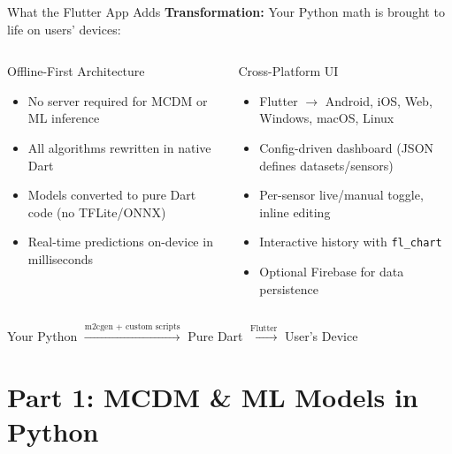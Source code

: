 \documentclass[aspectratio=169]{beamer}
\begin{document}
\begin{frame}{What the Flutter App Adds}
  \textbf{Transformation:} Your Python math is brought to life on users' devices:

  \vspace{0.3cm}
  \begin{columns}
    \begin{block}{Offline-First Architecture}
      \begin{itemize}
        \item No server required for MCDM or ML inference
        \item All algorithms rewritten in \alert{native Dart}
        \item Models converted to \alert{pure Dart code} (no TFLite/ONNX)
        \item Real-time predictions on-device in milliseconds
      \end{itemize}
    \end{block}
    \begin{block}{Cross-Platform UI}
      \begin{itemize}
        \item Flutter $\rightarrow$ Android, iOS, Web, Windows, macOS, Linux
        \item Config-driven dashboard (JSON defines datasets/sensors)
        \item Per-sensor live/manual toggle, inline editing
        \item Interactive history with \texttt{fl\_chart}
        \item Optional Firebase for data persistence
      \end{itemize}
    \end{block}
  \end{columns}

  \vspace{0.3cm}
  \centering
  \small Your Python $\xrightarrow{\text{m2cgen + custom scripts}}$ Pure Dart $\xrightarrow{\text{Flutter}}$ User's Device
\end{frame}

\section{Part 1: MCDM \& ML Models in Python}
\end{document}
